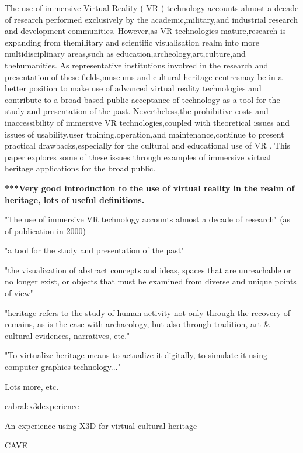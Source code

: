 The use of immersive Virtual Reality (
VR
) technology accounts almost a decade of research performed exclusively by the academic,military,and industrial research and development communities. However,as
VR
technologies mature,research is expanding from themilitary and scientific visualisation realm into more multidisciplinary areas,such as education,archeology,art,culture,and thehumanities. As representative institutions involved in the research and presentation of these fields,museums and cultural heritage centresmay be in a better position to make use of advanced virtual reality technologies and contribute to a broad-based public acceptance of technology as a tool for the study and presentation of the past. Nevertheless,the prohibitive costs and inaccessibility of immersive
VR
technologies,coupled with theoretical issues and issues of usability,user training,operation,and maintenance,continue to present  practical drawbacks,especially for the cultural and educational use of 
VR
. This paper explores some of these issues through examples of immersive virtual heritage applications for the broad public.


\textbf{***Very good introduction to the use of virtual reality in the realm of heritage, lots of useful definitions.}
        
"The use of immersive VR technology accounts almost a decade of research" (as of publication in 2000)
        
"a tool for the study and presentation of the past"
        
"the visualization of abstract concepts and ideas, spaces that are unreachable or no longer exist, or objects
that must be examined from diverse and unique points of view"
        
"heritage refers to the study of human activity not only through the recovery of remains, as is the case
with archaeology, but also through tradition, art & cultural evidences, narratives, etc."
        
"To virtualize heritage means to actualize it digitally, to simulate it using computer graphics technology..."
        
Lots more, etc.


cabral:x3dexperience

An experience using X3D for virtual cultural heritage

CAVE

